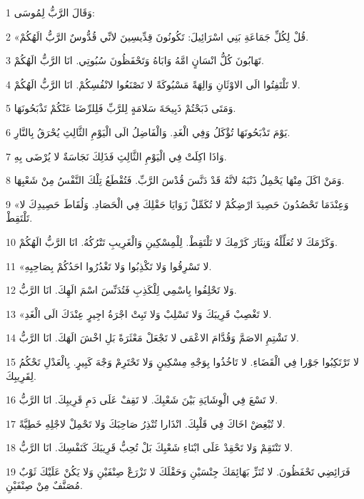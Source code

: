 \par 1 وَقَالَ الرَّبُّ لِمُوسَى:
\par 2 «قُلْ لِكُلِّ جَمَاعَةِ بَنِي اسْرَائِيلَ: تَكُونُونَ قِدِّيسِينَ لانِّي قُدُّوسٌ الرَّبُّ الَهُكُمْ.
\par 3 تَهَابُونَ كُلُّ انْسَانٍ امَّهُ وَابَاهُ وَتَحْفَظُونَ سُبُوتِي. انَا الرَّبُّ الَهُكُمْ.
\par 4 لا تَلْتَفِتُوا الَى الاوْثَانِ وَالِهَةً مَسْبُوكَةً لا تَصْنَعُوا لانْفُسِكُمْ. انَا الرَّبُّ الَهُكُمْ.
\par 5 وَمَتَى ذَبَحْتُمْ ذَبِيحَةَ سَلامَةٍ لِلرَّبِّ فَلِلرِّضَا عَنْكُمْ تَذْبَحُونَهَا.
\par 6 يَوْمَ تَذْبَحُونَهَا تُؤْكَلُ وَفِي الْغَدِ. وَالْفَاضِلُ الَى الْيَوْمِ الثَّالِثِ يُحْرَقُ بِالنَّارِ.
\par 7 وَاذَا اكِلَتْ فِي الْيَوْمِ الثَّالِثِ فَذَلِكَ نَجَاسَةٌ لا يُرْضَى بِهِ.
\par 8 وَمَنْ اكَلَ مِنْهَا يَحْمِلُ ذَنْبَهُ لانَّهُ قَدْ دَنَّسَ قُدْسَ الرَّبِّ. فَتُقْطَعُ تِلْكَ النَّفْسُ مِنْ شَعْبِهَا.
\par 9 «وَعِنْدَمَا تَحْصُدُونَ حَصِيدَ ارْضِكُمْ لا تُكَمِّلْ زَوَايَا حَقْلِكَ فِي الْحَصَادِ. وَلُقَاطَ حَصِيدِكَ لا تَلْتَقِطْ.
\par 10 وَكَرْمَكَ لا تُعَلِّلْهُ وَنِثَارَ كَرْمِكَ لا تَلْتَقِطْ. لِلْمِسْكِينِ وَالْغَرِيبِ تَتْرُكُهُ. انَا الرَّبُّ الَهُكُمْ.
\par 11 «لا تَسْرِقُوا وَلا تَكْذِبُوا وَلا تَغْدُرُوا احَدُكُمْ بِصَاحِبِهِ.
\par 12 وَلا تَحْلِفُوا بِاسْمِي لِلْكَذِبِ فَتُدَنِّسَ اسْمَ الَهِكَ. انَا الرَّبُّ.
\par 13 «لا تَغْصِبْ قَرِيبَكَ وَلا تَسْلِبْ وَلا تَبِتْ اجْرَةُ اجِيرٍ عِنْدَكَ الَى الْغَدِ.
\par 14 لا تَشْتِمِ الاصَمَّ وَقُدَّامَ الاعْمَى لا تَجْعَلْ مَعْثَرَةً بَلِ اخْشَ الَهَكَ. انَا الرَّبُّ.
\par 15 لا تَرْتَكِبُوا جَوْرا فِي الْقَضَاءِ. لا تَاخُذُوا بِوَجْهِ مِسْكِينٍ وَلا تَحْتَرِمْ وَجْهَ كَبِيرٍ. بِالْعَدْلِ تَحْكُمُ لِقَرِيبِكَ.
\par 16 لا تَسْعَ فِي الْوِشَايَةِ بَيْنَ شَعْبِكَ. لا تَقِفْ عَلَى دَمِ قَرِيبِكَ. انَا الرَّبُّ.
\par 17 لا تُبْغِضْ اخَاكَ فِي قَلْبِكَ. انْذَارا تُنْذِرُ صَاحِبَكَ وَلا تَحْمِلْ لاجْلِهِ خَطِيَّةً.
\par 18 لا تَنْتَقِمْ وَلا تَحْقِدْ عَلَى ابْنَاءِ شَعْبِكَ بَلْ تُحِبُّ قَرِيبَكَ كَنَفْسِكَ. انَا الرَّبُّ.
\par 19 فَرَائِضِي تَحْفَظُونَ. لا تُنَزِّ بَهَائِمَكَ جِنْسَيْنِ وَحَقْلَكَ لا تَزْرَعْ صِنْفَيْنِ وَلا يَكُنْ عَلَيْكَ ثَوْبٌ مُصَنَّفٌ مِنْ صِنْفَيْنِ.
